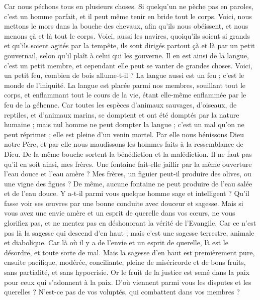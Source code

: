 \begin{multicols}{2}
Car nous péchons tous en plusieurs choses. Si quelqu'un ne pèche pas en paroles, c'est un homme parfait, et il peut même tenir en bride tout le corps.
Voici, nous mettons le mors dans la bouche des chevaux, afin qu'ils nous obéissent, et nous menons çà et là tout le corps.
Voici, aussi les navires, quoiqu'ils soient si grands et qu'ils soient agités par la tempête, ils sont dirigés partout çà et là par un petit gouvernail, selon qu'il plaît à celui qui les gouverne.
Il en est ainsi de la langue, c'est un petit membre, et cependant elle peut se vanter de grandes choses. Voici, un petit feu, combien de bois allume-t-il ?
La langue aussi est un feu ; c'est le monde de l'iniquité. La langue est placée parmi nos membres, souillant tout le corps, et enflammant tout le cours de la vie, étant elle-même enflammée par le feu de la géhenne.
Car toutes les espèces d'animaux sauvages, d'oiseaux, de reptiles, et d'animaux marins, se domptent et ont été domptés par la nature humaine ;
mais nul homme ne peut dompter la langue ; c'est un mal qu'on ne peut réprimer ; elle est pleine d'un venin mortel.
Par elle nous bénissons Dieu notre Père, et par elle nous maudissons les hommes faits à la ressemblance de Dieu.
De la même bouche sortent la bénédiction et la malédiction. Il ne faut pas qu'il en soit ainsi, mes frères.
Une fontaine fait-elle jaillir par la même ouverture l'eau douce et l'eau amère ?
Mes frères, un figuier peut-il produire des olives, ou une vigne des figues ? De même, aucune fontaine ne peut produire de l'eau salée et de l'eau douce.
Y a-t-il parmi vous quelque homme sage et intelligent ? Qu'il fasse voir ses œuvres par une bonne conduite avec douceur et sagesse.
Mais si vous avez une envie amère et un esprit de querelle dans vos cœurs, ne vous glorifiez pas, et ne mentez pas en déshonorant la vérité de l'Evangile.
Car ce n'est pas là la sagesse qui descend d'en haut ; mais c'est une sagesse terrestre, animale et diabolique.
Car là où il y a de l'envie et un esprit de querelle, là est le désordre, et toute sorte de mal.
Mais la sagesse d'en haut est premièrement pure, ensuite pacifique, modérée, conciliante, pleine de miséricorde et de bons fruits, sans partialité, et sans hypocrisie.
Or le fruit de la justice est semé dans la paix pour ceux qui s'adonnent à la paix.
\VerseOne{}D'où viennent parmi vous les disputes et les querelles ? N'est-ce pas de vos voluptés, qui combattent dans vos membres ?

\end{multicols}
